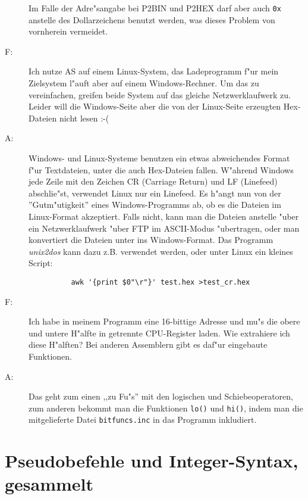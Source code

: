 \documentclass[12pt,a4paper,twoside]{report}
\newcommand{\tty}[1]{{\tt #1}}
\begin{document}
\begin{description}
{          Im Falle der Adre"sangabe bei P2BIN und P2HEX darf aber auch
          \tty{0x} anstelle des Dollarzeichens benutzt werden, was dieses
          Problem von vornherein vermeidet.}
\vspace{0.3cm}
\item[F:]{Ich nutze AS auf einem Linux-System, das Ladeprogramm f"ur
          mein Zielsystem l"auft aber auf einem Windows-Rechner.  Um das
          zu vereinfachen, greifen beide System auf das gleiche
          Netzwerklaufwerk zu.  Leider will die Windows-Seite aber die
          von der Linux-Seite erzeugten Hex-Dateien nicht lesen :-(}
\item[A:]{Windows- und Linux-Systeme benutzen ein etwas abweichendes
          Format f"ur Textdateien, unter die auch Hex-Dateien fallen.
          W"ahrend Windows jede Zeile mit den Zeichen CR (Carriage Return)
          und LF (Linefeed) abschlie"st, verwendet Linux nur ein Linefeed.
          Es h"angt nun von der ''Gutm"utigkeit'' eines Windows-Programms
          ab, ob es die Dateien im Linux-Format akzeptiert.  Falls nicht,
          kann man die Dateien anstelle "uber ein Netzwerklaufwerk "uber
          FTP im ASCII-Modus "ubertragen, oder man konvertiert die Dateien
          unter ins Windows-Format.  Das Programm {\em unix2dos} kann dazu
          z.B. verwendet werden, oder unter Linux ein kleines Script:
          \begin{verbatim}
          awk '{print $0"\r"}' test.hex >test_cr.hex
          \end{verbatim}}
\vspace{0.3cm}
\item[F:]{Ich habe in meinem Programm eine 16-bittige Adresse und mu"s
          die obere und untere H"alfte in getrennte CPU-Register laden.
          Wie extrahiere ich diese H"alften?  Bei anderen Assemblern
          gibt es daf"ur eingebaute Funktionen.}
\item[A:]{Das geht zum einen ,,zu Fu"s'' mit den logischen und
          Schiebeoperatoren, zum anderen bekommt man die Funktionen
          {\tt lo()} und {\tt hi()}, indem man die mitgelieferte Datei
          {\tt bitfuncs.inc} in das Programm inkludiert.}          
\end{description}


\cleardoublepage
\chapter{Pseudobefehle und Integer-Syntax, gesammelt}
\label{SectPseudoInst}
\end{document}
